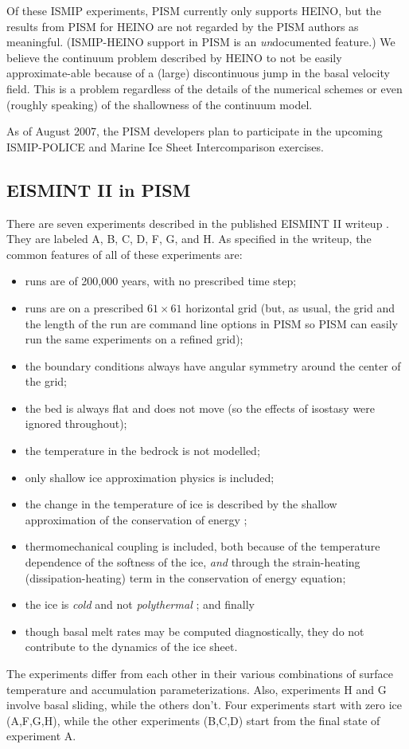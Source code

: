 \documentclass[11pt,final]{amsart}
\begin{document}
Of these ISMIP experiments, PISM currently only supports HEINO, but the results from PISM for HEINO are not regarded by the PISM authors as meaningful.  (ISMIP-HEINO support in PISM is an \emph{un}documented feature.)  We believe the continuum problem described by HEINO to not be easily approximate-able because of a (large) discontinuous jump in the basal velocity field.  This is a problem regardless of the details of the numerical schemes or even (roughly speaking) of the shallowness of the continuum model.

As of August 2007, the PISM developers plan to participate in the upcoming ISMIP-POLICE and Marine Ice Sheet Intercomparison exercises.

\subsection{EISMINT II in PISM}  There are seven experiments described in the published EISMINT II writeup \cite{EISMINT00}. They are labeled A, B, C, D, F, G, and H.  As specified in the writeup, the common features of all of these experiments are:\begin{itemize}
\item runs are of 200,000 years, with no prescribed time step;
\item runs are on a prescribed $61\times 61$ horizontal grid (but, as usual, the grid and the length of the run are command line options in PISM so PISM can easily run the same experiments on a refined grid);
\item the boundary conditions always have angular symmetry around the center of the grid;
\item the bed is always flat and does not move (so the effects of isostasy were ignored throughout);
\item the temperature in the bedrock is not modelled;
\item only shallow ice approximation physics is included;
\item the change in the temperature of ice is described by the shallow approximation of the conservation of energy \cite{Fowler};
\item thermomechanical coupling is included, both because of the temperature dependence of the softness of the ice, \emph{and} through the strain-heating (dissipation-heating) term in the conservation of energy equation;
\item the ice is \emph{cold} and not \emph{polythermal} \cite{Greve}; and finally
\item though basal melt rates may be computed diagnostically, they do not contribute to the dynamics of the ice sheet.
\end{itemize}
The experiments differ from each other in their various combinations of surface temperature and accumulation parameterizations.  Also, experiments H and G involve basal sliding, while the others don't.  Four experiments start with zero ice (A,F,G,H), while the other experiments (B,C,D) start from the final state of experiment A.
\end{document}
